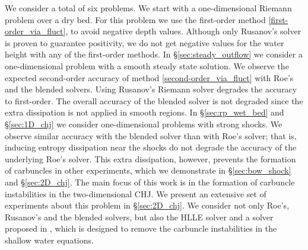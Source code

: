 \documentclass[preprint, 11pt]{article}
\begin{document}
We consider a total of six problems. We start with a one-dimensional Riemann problem over a dry bed.
For this problem we use the first-order method \eqref{first-order_via_fluct},
to avoid negative depth values. Although only Rusanov's solver is proven to guarantee
positivity, we do not get negative values for the water height with any of the first-order methods.
In \S \ref{sec:steady_outflow} we consider a one-dimensional problem with a smooth steady state solution. We observe the expected
second-order accuracy of method \eqref{second-order_via_fluct} with Roe's and the blended solvers. Using
Rusanov's Riemann solver degrades the accuracy to first-order. The overall accuracy of the blended solver
is not degraded since the extra dissipation is not applied in smooth regions.
In \S\ref{sec:rp_wet_bed} and \S\ref{sec:1D_chj} we consider one-dimensional problems with strong shocks. We observe similar accuracy with the
blended solver than with Roe's solver; that is, inducing entropy dissipation near the shocks do not degrade the accuracy
of the underlying Roe's solver. This extra dissipation, however, prevents the formation of carbuncles in other experiments,
which we demonstrate in \S \ref{sec:bow_shock} and \S\ref{sec:2D_chj}.
The main focus of this work is in the formation of carbuncle instabilities in the two-dimensional CHJ. We present
an extensive set of experiments about this problem in \S \ref{sec:2D_chj}.
We consider not only Roe's, Rusanov's and the blended solvers, but also the HLLE solver and a solver proposed in \cite{kemm2014note},
which is designed to remove the carbuncle instabilities in the shallow water equations.
\end{document}

